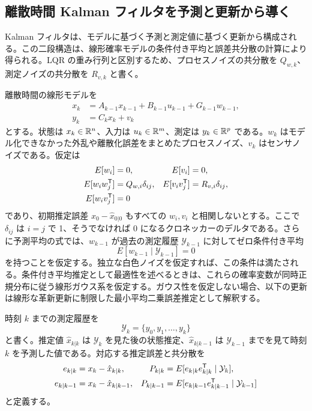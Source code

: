 \subsection{離散時間 Kalman フィルタを予測と更新から導く}

Kalman フィルタは、モデルに基づく予測と測定値に基づく更新から構成される。この二段構造は、線形確率モデルの条件付き平均と誤差共分散の計算により得られる。LQR の重み行列と区別するため、プロセスノイズの共分散を $Q_{w,k}$、測定ノイズの共分散を $R_{v,k}$ と書く。

離散時間の線形モデルを
\begin{align}
  x_k&=A_{k-1}x_{k-1}+B_{k-1}u_{k-1}+G_{k-1}w_{k-1},\label{eq:kf-state-model}\\
  y_k&=C_kx_k+v_k
  \label{eq:kf-measurement-model}
\end{align}
とする。状態は $x_k\in\mathbb{R}^n$、入力は $u_k\in\mathbb{R}^m$、測定は $y_k\in\mathbb{R}^p$ である。$w_k$ はモデル化できなかった外乱や離散化誤差をまとめたプロセスノイズ、$v_k$ はセンサノイズである。仮定は
\begin{align}
  E[w_i]&=0,
  &E[v_i]&=0,\\
  E[w_iw_j^{\mathsf{T}}]&=Q_{w,i}\delta_{ij},
  &E[v_iv_j^{\mathsf{T}}]&=R_{v,i}\delta_{ij},\\
  E[w_iv_j^{\mathsf{T}}]&=0
\end{align}
であり、初期推定誤差 $x_0-\hat{x}_{0|0}$ もすべての $w_i,v_i$ と相関しないとする。ここで $\delta_{ij}$ は $i=j$ で 1、そうでなければ 0 になるクロネッカーのデルタである。さらに予測平均の式では、$w_{k-1}$ が過去の測定履歴 $\mathcal{Y}_{k-1}$ に対してゼロ条件付き平均
\begin{equation}
  E[w_{k-1}\mid\mathcal{Y}_{k-1}]=0
\end{equation}
を持つことを仮定する。独立な白色ノイズを仮定すれば、この条件は満たされる。条件付き平均推定として最適性を述べるときは、これらの確率変数が同時正規分布に従う線形ガウス系を仮定する。ガウス性を仮定しない場合、以下の更新は線形な革新更新に制限した最小平均二乗誤差推定として解釈する。

時刻 $k$ までの測定履歴を
\begin{equation}
  \mathcal{Y}_k=\{y_0,y_1,\ldots,y_k\}
\end{equation}
と書く。推定値 $\hat{x}_{k|k}$ は $\mathcal{Y}_k$ を見た後の状態推定、$\hat{x}_{k|k-1}$ は $\mathcal{Y}_{k-1}$ までを見て時刻 $k$ を予測した値である。対応する推定誤差と共分散を
\begin{align}
  e_{k|k}&=x_k-\hat{x}_{k|k},
  &P_{k|k}&=E[e_{k|k}e_{k|k}^{\mathsf{T}}\mid\mathcal{Y}_k],\\
  e_{k|k-1}&=x_k-\hat{x}_{k|k-1},
  &P_{k|k-1}&=E[e_{k|k-1}e_{k|k-1}^{\mathsf{T}}\mid\mathcal{Y}_{k-1}]
\end{align}
と定義する。

